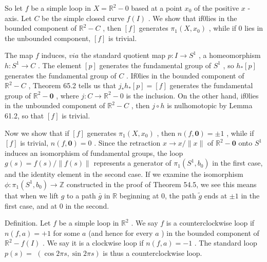 So let \(f\) be a simple loop in \(X = {\mathbb{R}}^{2} - 0\) based at a point \({x}_{0}\) of the positive \(x\) - axis. Let \(C\) be the simple closed curve \(f\left( I\right)\) . We show that if0lies in the bounded component of \({\mathbb{R}}^{2} - C\) , then \(\left\lbrack  f\right\rbrack\) generates \({\pi }_{1}\left( {X,{x}_{0}}\right)\) , while if 0 lies in the unbounded component, \(\left\lbrack  f\right\rbrack\) is trivial.

The map \(f\) induces, \({via}\) the standard quotient map \(p : I \rightarrow  {S}^{1}\) , a homeomorphism \(h : {S}^{1} \rightarrow  C\) . The element \(\left\lbrack  p\right\rbrack\) generates the fundamental group of \({S}^{1}\) , so \({h}_{ * }\left\lbrack  p\right\rbrack\) generates the fundamental group of \(C\) . If0lies in the bounded component of \({\mathbb{R}}^{2} - C\) , Theorem 65.2 tells us that \({j}_{ * }{h}_{ * }\left\lbrack  p\right\rbrack   = \left\lbrack  f\right\rbrack\) generates the fundamental group of \({\mathbb{R}}^{2} - \mathbf{0}\) , where \(j : C \rightarrow  {\mathbb{R}}^{2} - 0\) is the inclusion. On the other hand, if0lies in the unbounded component of \({\mathbb{R}}^{2} - C\) , then \(j \circ  h\) is nulhomotopic by Lemma 61.2, so that \(\left\lbrack  f\right\rbrack\) is trivial.

Now we show that if \(\left\lbrack  f\right\rbrack\) generates \({\pi }_{1}\left( {X,{x}_{0}}\right)\) , then \(n\left( {f,\mathbf{0}}\right)  =  \pm  1\) , while if \(\left\lbrack  f\right\rbrack\) is trivial, \(n\left( {f,\mathbf{0}}\right)  = 0\) . Since the retraction \(x \rightarrow  x/\parallel x\parallel\) of \({\mathbb{R}}^{2} - \mathbf{0}\) onto \({S}^{1}\) induces an isomorphism of fundamental groups, the loop \(g\left( s\right)  = f\left( s\right) /\parallel f\left( s\right) \parallel\) represents a generator of \({\pi }_{1}\left( {{S}^{1},{b}_{0}}\right)\) in the first case, and the identity element in the second case. If we examine the isomorphism \(\phi  : {\pi }_{1}\left( {{S}^{1},{b}_{0}}\right)  \rightarrow  \mathbb{Z}\) constructed in the proof of Theorem 54.5, we see this means that when we lift \(g\) to a path \(\bar{g}\) in \(\mathbb{R}\) beginning at 0, the path \(\widetilde{g}\) ends at \(\pm  1\) in the first case, and at 0 in the second.

Definition. Let \(f\) be a simple loop in \({\mathbb{R}}^{2}\) . We say \(f\) is a counterclockwise loop if \(n\left( {f,a}\right)  =  + 1\) for some \(a\) (and hence for every \(a\) ) in the bounded component of \({\mathbb{R}}^{2} - f\left( I\right)\) . We say it is a clockwise loop if \(n\left( {f,a}\right)  =  - 1\) . The standard loop \(p\left( s\right)  =\)  \(\left( {\cos {2\pi s},\sin {2\pi s}}\right)\) is thus a counterclockwise loop.

